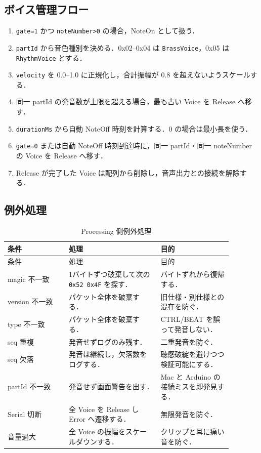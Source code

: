 \documentclass[lualatex,book,openany,paper=a4paper,jafontsize=11.5pt,jafontscale=1.05]{jlreq}
\begin{document}
\subsection{ボイス管理フロー}
\begin{enumerate}
  \item \texttt{gate=1} かつ \texttt{noteNumber>0} の場合，NoteOn として扱う．
  \item \texttt{partId} から音色種別を決める．0x02--0x04 は \texttt{BrassVoice}，0x05 は \texttt{RhythmVoice} とする．
  \item \texttt{velocity} を 0.0--1.0 に正規化し，合計振幅が 0.8 を超えないようスケールする．
  \item 同一 partId の発音数が上限を超える場合，最も古い Voice を Release へ移す．
  \item \texttt{durationMs} から自動 NoteOff 時刻を計算する．0 の場合は最小長を使う．
  \item \texttt{gate=0} または自動 NoteOff 時刻到達時に，同一 partId・同一 noteNumber の Voice を Release へ移す．
  \item Release が完了した Voice は配列から削除し，音声出力との接続を解除する．
\end{enumerate}

\subsection{例外処理}
\begin{longtable}{p{0.24\linewidth}p{0.36\linewidth}p{0.28\linewidth}}
\caption{Processing 側例外処理}\label{tab:exceptions}\\
\hline
条件 & 処理 & 目的 \\
\hline
\endfirsthead
\hline
条件 & 処理 & 目的 \\
\hline
\endhead
magic 不一致 & 1バイトずつ破棄して次の \texttt{0x52 0x4F} を探す． & バイトずれから復帰する． \\
\hline
version 不一致 & パケット全体を破棄する． & 旧仕様・別仕様との混在を防ぐ． \\
\hline
type 不一致 & パケット全体を破棄する． & CTRL/BEAT を誤って発音しない． \\
\hline
seq 重複 & 発音せずログのみ残す． & 二重発音を防ぐ． \\
\hline
seq 欠落 & 発音は継続し，欠落数をログする． & 聴感破綻を避けつつ検証可能にする． \\
\hline
partId 不一致 & 発音せず画面警告を出す． & Mac と Arduino の接続ミスを即発見する． \\
\hline
Serial 切断 & 全 Voice を Release し Error へ遷移する． & 無限発音を防ぐ． \\
\hline
音量過大 & 全 Voice の振幅をスケールダウンする． & クリップと耳に痛い音を防ぐ． \\
\hline
\end{longtable}
\end{document}
